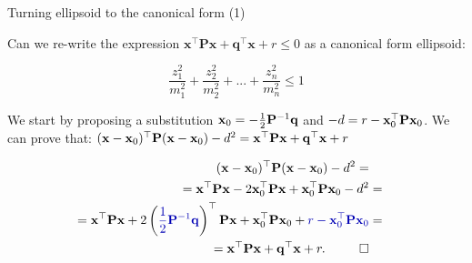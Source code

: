 \documentclass{beamer}
\begin{document}
\begin{frame}{Turning ellipsoid to the canonical form (1)}
	\begin{flushleft}
		
		Can we re-write the expression $\mathbf{x}^\top \mathbf{P} \mathbf{x} + \mathbf{q}^\top\mathbf{x} + r \leq 0$ as a canonical form ellipsoid:
		
		\begin{equation}
			\frac{z_1^2}{m_1^2} + \frac{z_2^2}{m_2^2} + ... + 
			\frac{z_n^2}{m_n^2} \leq 1
		\end{equation}
		
		We start by proposing a substitution $\mathbf{x}_0 = - \frac{1}{2}\mathbf{P}^{-1}\mathbf{q}$ and $-d = r - \mathbf{x}_0^\top \mathbf{P} \mathbf{x}_0$. We can prove that: $(\mathbf{x} - \mathbf{x}_0)^\top \mathbf{P}(\mathbf{x} - \mathbf{x}_0) - d^2 =
		\mathbf{x}^\top \mathbf{P} \mathbf{x} + \mathbf{q}^\top\mathbf{x} + r$
		
		\begin{align}
			(\bo{x} - \bo{x}_0)\T \bo{P}(\bo{x} - \bo{x}_0) - d^2 =
			\\
			= \bo{x}\T\bo{P}\bo{x} - 2\bo{x}_0\T\bo{P}\bo{x} + \bo{x}_0\T\bo{P}\bo{x}_0 - d^2 &=
			\\
			= \bo{x}\T\bo{P}\bo{x} + 2\left(\textcolor{mydarkblue}{\frac{1}{2}\bo{P}^{-1}\bo{q}}\right)\T\bo{P}\bo{x} + \bo{x}_0\T\bo{P}\bo{x}_0 + \textcolor{mydarkblue}{r - \bo{x}_0\T \bo{P} \bo{x}_0} &=
			\\
			= \bo{x}\T\bo{P}\bo{x} + \bo{q}\T \bo{x} + r. \ \ \qed
		\end{align}
		
	\end{flushleft}
\end{frame}
\end{document}
